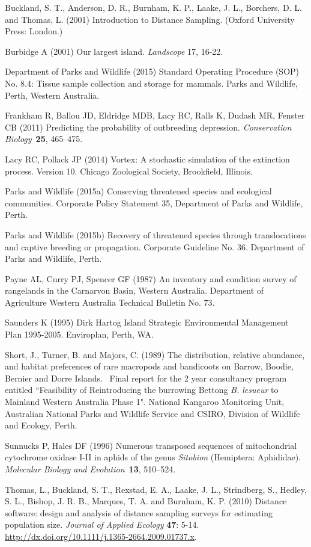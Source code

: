 \documentclass[version=last,
    paper=a4,                               %
    10pt,                                   %
    dvipsnames,
    oneside,                              %
    headings=openany,                       %
    open=any,
    BCOR=7mm,                               %
    DIV=15,     %
]{scrbook}
\begin{document}
Buckland, S. T., Anderson, D. R., Burnham, K. P., Laake, J. L.,
Borchers, D. L. and Thomas, L. (2001) Introduction to Distance Sampling.
(Oxford University Press: London.)

Burbidge A (2001) Our largest island. \emph{Landscope} 17, 16-22.

Department of Parks and Wildlife (2015) Standard Operating Procedure
(SOP) No. 8.4: Tissue sample collection and storage for mammals. Parks
and Wildlife, Perth, Western Australia.

Frankham R, Ballou JD, Eldridge MDB, Lacy RC, Ralls K, Dudash MR,
Fenster CB (2011) Predicting the probability of outbreeding depression.
\emph{Conservation Biology}~\textbf{25}, 465--475.

Lacy RC, Pollack JP (2014) Vortex: A stochastic simulation of the
extinction process. Version 10. Chicago Zoological Society, Brookfield,
Illinois.

Parks and Wildlife (2015a) Conserving threatened species and ecological
communities. Corporate Policy Statement 35, Department of Parks and
Wildlife, Perth.

Parks and Wildlife (2015b) Recovery of threatened species through
translocations and captive breeding or propagation. Corporate Guideline
No. 36. Department of Parks and Wildlife, Perth.

Payne AL, Curry PJ, Spencer GF (1987) An inventory and condition survey
of rangelands in the Carnarvon Basin, Western Australia. Department of
Agriculture Western Australia Technical Bulletin No. 73.

Saunders K (1995) Dirk Hartog Island Strategic Environmental Management
Plan 1995-2005. Enviroplan, Perth, WA.

Short, J., Turner, B. and Majors, C. (1989) The distribution, relative
abundance, and habitat preferences of rare macropods and bandicoots on
Barrow, Boodie, Bernier and Dorre Islands.~ Final report for the 2 year
consultancy program entitled ``Feasibility of Reintroducing the
burrowing Bettong \emph{B. lesueur} to Mainland Western Australia Phase
1". National Kangaroo Monitoring Unit, Australian National Parks and
Wildlife Service and CSIRO, Division of Wildlife and Ecology, Perth.

Sunnucks P, Hales DF (1996) Numerous transposed sequences of
mitochondrial cytochrome oxidase I-II in aphids of the genus
\emph{Sitobion} (Hemiptera: Aphididae). \emph{Molecular Biology and
Evolution}~\textbf{13}, 510--524.

Thomas, L., Buckland, S. T., Rexstad, E. A., Laake, J. L., Strindberg,
S., Hedley, S. L., Bishop, J. R. B., Marques, T. A. and Burnham, K. P.
(2010) Distance software: design and analysis of distance sampling
surveys for estimating population size. \emph{Journal of Applied
Ecology} \textbf{47}: 5-14.
\url{http://dx.doi.org/10.1111/j.1365-2664.2009.01737.x}.
\end{document}
